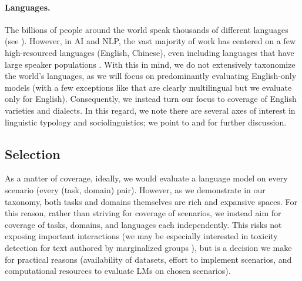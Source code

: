 \paragraph{Languages.}
The billions of people around the world speak thousands of different languages (see ).
However, in AI and NLP, the vast majority of work has centered on a few high-resourced languages (\eg English, Chinese), even including languages that have large speaker populations \citep[\eg there are more than 65 million speakers of Fula, a West African language, but few if any NLP resources exist for Fula;][]{nguer2020sencorpus}.
With this in mind, we do not extensively taxonomize the world's languages, as we will focus on predominantly evaluating English-only models (with a few exceptions like \bloom that are clearly multilingual but we evaluate only for English).
Consequently, we instead turn our focus to coverage of English varieties and dialects.
In this regard, we note there are several axes of interest in linguistic typology and sociolinguistics; we point to \citet[][\S2.1]{bommasani2021opportunities} and \citet{joshi2020state} for further discussion. 

\hypertarget{generic-scenarios-selection}{\subsection{Selection}}
\label{sec:generic-scenarios-selection}

As a matter of coverage, ideally, we would evaluate a language model on every scenario (\ie every (task, domain) pair).
However, as we demonstrate in our taxonomy, both tasks and domains themselves are rich and expansive spaces.
For this reason, rather than striving for coverage of scenarios, we instead aim for coverage of tasks, domains, and languages each independently.
This risks not exposing important interactions (\eg we may be especially interested in toxicity detection for text authored by marginalized groups \citep{sap2019risk}), but is a decision we make for practical reasons (\eg availability of datasets, effort to implement scenarios, and computational resources to evaluate LMs on chosen scenarios).

